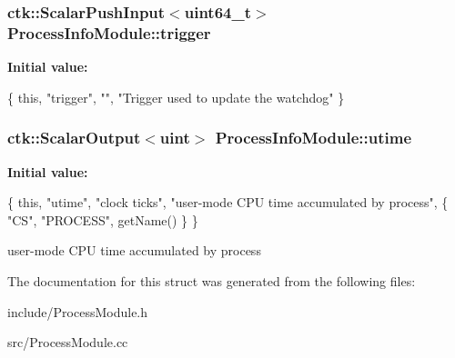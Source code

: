 \subsubsection[{\texorpdfstring{trigger}{trigger}}]{\setlength{\rightskip}{0pt plus 5cm}ctk\+::\+Scalar\+Push\+Input$<$uint64\+\_\+t$>$ Process\+Info\+Module\+::trigger}\hypertarget{structProcessInfoModule_a3f91718924955fc3bdbd2070c08eec2c}{}\label{structProcessInfoModule_a3f91718924955fc3bdbd2070c08eec2c}
{\bfseries Initial value\+:}
\begin{DoxyCode}
\{ \textcolor{keyword}{this}, \textcolor{stringliteral}{"trigger"}, \textcolor{stringliteral}{""},
      \textcolor{stringliteral}{"Trigger used to update the watchdog"} \}
\end{DoxyCode}
\subsubsection[{\texorpdfstring{utime}{utime}}]{\setlength{\rightskip}{0pt plus 5cm}ctk\+::\+Scalar\+Output$<$uint$>$ Process\+Info\+Module\+::utime}\hypertarget{structProcessInfoModule_a80e5447f89a1af566893b4a8ce32c75e}{}\label{structProcessInfoModule_a80e5447f89a1af566893b4a8ce32c75e}
{\bfseries Initial value\+:}
\begin{DoxyCode}
\{ \textcolor{keyword}{this}, \textcolor{stringliteral}{"utime"}, \textcolor{stringliteral}{"clock ticks"}, \textcolor{stringliteral}{"user-mode CPU time accumulated by process"},
    \{ \textcolor{stringliteral}{"CS"}, \textcolor{stringliteral}{"PROCESS"}, getName() \} \}
\end{DoxyCode}
user-\/mode C\+PU time accumulated by process 

The documentation for this struct was generated from the following files\+:\begin{DoxyCompactItemize}
\item 
include/Process\+Module.\+h\item 
src/Process\+Module.\+cc\end{DoxyCompactItemize}
